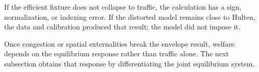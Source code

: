 If the efficient fixture does not collapse to traffic, the calculation has a
sign, normalization, or indexing error. If the distorted model remains close
to Hulten, the data and calibration produced that result; the model did not
impose it.


Once congestion or spatial externalities break the envelope result, welfare
depends on the equilibrium response rather than traffic alone. The next
subsection obtains that response by differentiating the joint equilibrium
system.
